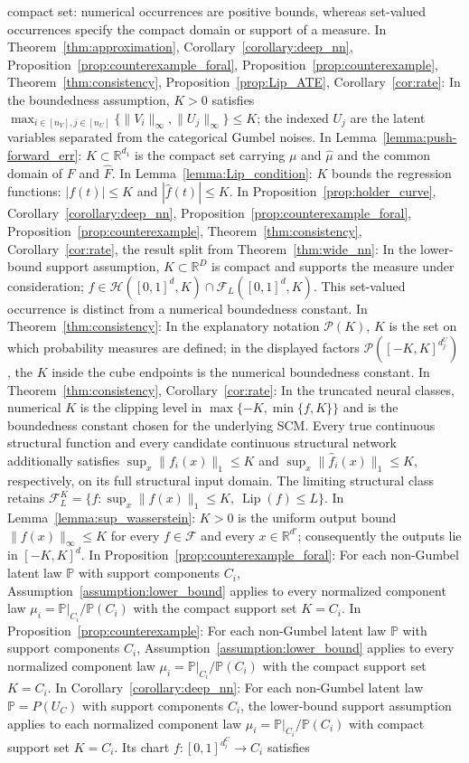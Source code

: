 \documentclass[12pt]{article}
\theoremstyle{plain}
\theoremstyle{definition}
\theoremstyle{remark}
\begin{document}
compact set: numerical occurrences are positive bounds, whereas set-valued occurrences specify the compact domain or support of a measure. In Theorem~\ref{thm:approximation}, Corollary~\ref{corollary:deep_nn}, Proposition~\ref{prop:counterexample_foral}, Proposition~\ref{prop:counterexample}, Theorem~\ref{thm:consistency}, Proposition~\ref{prop:Lip_ATE}, Corollary~\ref{cor:rate}: In the boundedness assumption, $K>0$ satisfies $\max_{i\in[n_V],j\in[n_U]}\{\|V_i\|_\infty,\|U_j\|_\infty\}\leqslant K$; the indexed $U_j$ are the latent variables separated from the categorical Gumbel noises. In Lemma~\ref{lemma:push-forward_err}: $K\subset\mathbb{R}^{d_1}$ is the compact set carrying $\mu$ and $\hat{\mu}$ and the common domain of $F$ and $\hat{F}$. In Lemma~\ref{lemma:Lip_condition}: $K$ bounds the regression functions: $|f(t)|\leqslant K$ and $|\hat{f}(t)|\leqslant K$. In Proposition~\ref{prop:holder_curve}, Corollary~\ref{corollary:deep_nn}, Proposition~\ref{prop:counterexample_foral}, Proposition~\ref{prop:counterexample}, Theorem~\ref{thm:consistency}, Corollary~\ref{cor:rate}, the result split from Theorem~\ref{thm:wide_nn}: In the lower-bound support assumption, $K\subset\mathbb{R}^{D}$ is compact and supports the measure under consideration; $f\in\mathcal{H}([0,1]^d,K)\cap\mathcal{F}_L([0,1]^d,K)$. This set-valued occurrence is distinct from a numerical boundedness constant. In Theorem~\ref{thm:consistency}: In the explanatory notation $\mathcal{P}(K)$, $K$ is the set on which probability measures are defined; in the displayed factors $\mathcal{P}([-K,K]^{d_j^U})$, the $K$ inside the cube endpoints is the numerical boundedness constant. In Theorem~\ref{thm:consistency}, Corollary~\ref{cor:rate}: In the truncated neural classes, numerical $K$ is the clipping level in $\max\{-K,\min\{f,K\}\}$ and is the boundedness constant chosen for the underlying SCM. Every true continuous structural function and every candidate continuous structural network additionally satisfies $\sup_x\|f_i(x)\|_1\leqslant K$ and $\sup_x\|\hat f_i(x)\|_1\leqslant K$, respectively, on its full structural input domain. The limiting structural class retains $\mathcal F_L^K=\{f:\sup_x\|f(x)\|_1\leqslant K,\ \operatorname{Lip}(f)\leqslant L\}$. In Lemma~\ref{lemma:sup_wasserstein}: $K>0$ is the uniform output bound $\|f(x)\|_\infty\leqslant K$ for every $f\in\mathcal F$ and every $x\in\mathbb R^{d'}$; consequently the outputs lie in $[-K,K]^d$. In Proposition~\ref{prop:counterexample_foral}: For each non-Gumbel latent law $\mathbb P$ with support components $C_i$, Assumption~\ref{assumption:lower_bound} applies to every normalized component law $\mu_i=\mathbb P|_{C_i}/\mathbb P(C_i)$ with the compact support set $K=C_i$. In Proposition~\ref{prop:counterexample}: For each non-Gumbel latent law $\mathbb P$ with support components $C_i$, Assumption~\ref{assumption:lower_bound} applies to every normalized component law $\mu_i=\mathbb P|_{C_i}/\mathbb P(C_i)$ with the compact support set $K=C_i$. In Corollary~\ref{corollary:deep_nn}: For each non-Gumbel latent law $\mathbb P=P(U_C)$ with support components $C_i$, the lower-bound support assumption applies to each normalized component law $\mu_i=\mathbb P|_{C_i}/\mathbb P(C_i)$ with compact support set $K=C_i$. Its chart $f:[0,1]^{d_i^C}\rightarrow C_i$ satisfies 
\end{document}
